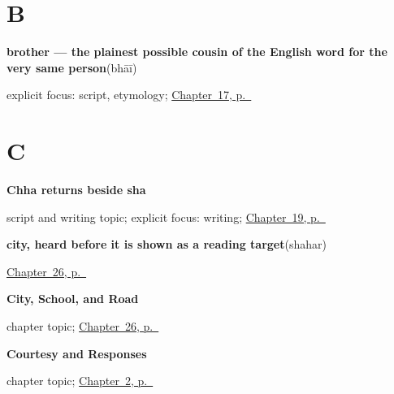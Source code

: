 \section*{B}

\noindent\begin{minipage}[t]{\linewidth}
\raggedright
\textbf{brother — the plainest possible cousin of the English word for the very same person}\enspace\emph{}\enspace(bhāī)\par
\footnotesize explicit focus: script, etymology; \hyperref[ch:gu-friend-and-family]{Chapter~17, p.~\pageref*{ch:gu-friend-and-family}}
\end{minipage}\par\smallskip

\section*{C}

\noindent\begin{minipage}[t]{\linewidth}
\raggedright
\textbf{Chha returns beside sha}\par
\footnotesize script and writing topic; explicit focus: writing; \hyperref[ch:gu-r4-script-names]{Chapter~19, p.~\pageref*{ch:gu-r4-script-names}}
\end{minipage}\par\smallskip

\noindent\begin{minipage}[t]{\linewidth}
\raggedright
\textbf{city, heard before it is shown as a reading target}\enspace\emph{}\enspace(shahar)\par
\footnotesize \hyperref[ch:gu-city-school-road]{Chapter~26, p.~\pageref*{ch:gu-city-school-road}}
\end{minipage}\par\smallskip

\noindent\begin{minipage}[t]{\linewidth}
\raggedright
\textbf{City, School, and Road}\par
\footnotesize chapter topic; \hyperref[ch:gu-city-school-road]{Chapter~26, p.~\pageref*{ch:gu-city-school-road}}
\end{minipage}\par\smallskip

\noindent\begin{minipage}[t]{\linewidth}
\raggedright
\textbf{Courtesy and Responses}\par
\footnotesize chapter topic; \hyperref[ch:greetings]{Chapter~2, p.~\pageref*{ch:greetings}}
\end{minipage}\par\smallskip

